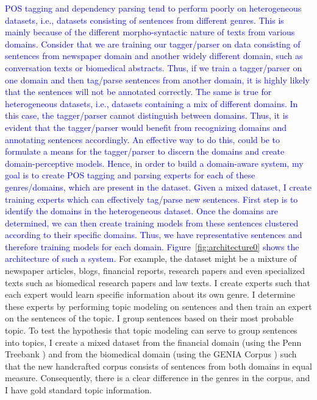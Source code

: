 \textcolor{blue}{POS tagging and dependency parsing tend to perform poorly on heterogeneous datasets, i.e., datasets consisting of sentences from different genres. This is mainly because of the different morpho-syntactic nature of texts from various domains. Consider that we are training our tagger/parser on data consisting of sentences from newspaper domain and another widely different domain, such as conversation texts or biomedical abstracts.  Thus, if we train a tagger/parser on one domain and then tag/parse sentences from another domain, it is highly likely that the sentences will not be annotated correctly. The same is true for heterogeneous datasets, i.e., datasets containing a mix of different domains. In this case, the tagger/parser cannot distinguish between domains.
Thus, it is evident that the tagger/parser would benefit from recognizing domains and annotating sentences accordingly. An effective way to do this, could be to formulate a means for the tagger/parser to discern the domains and create domain-perceptive models. 
Hence, in order to build a domain-aware system, my goal is to create POS tagging and parsing experts for each of these genres/domains, which are present in the dataset. Given a mixed dataset, I create training experts which can effectively tag/parse new sentences. First step is to identify the domains in the heterogeneous dataset. 
Once the domains are determined, we can then create training models from these sentences clustered according to their specific domains. Thus, we have representative sentences and therefore training models for each domain. Figure~\ref{fig:architecture0} shows the architecture of such a system.}
For example, the dataset might be a mixture of newspaper articles, blogs, financial reports, research papers and even specialized texts such as biomedical research papers and law texts. I create experts such that each expert would learn specific information about its own genre. I determine these experts by performing topic modeling on sentences and then train an expert on the sentences of the topic. I group sentences based on their most probable topic. To test the hypothesis that topic modeling can serve to group sentences into topics, I create a mixed dataset from the financial domain (using the Penn Treebank \cite{marcus:kim:ea:94}) and from the biomedical domain (using the GENIA Corpus \cite{tateisi:tsujii:04}) such that the new handcrafted corpus consists of sentences from both domains in equal measure. Consequently, there is a clear difference in the genres in the corpus, and I have gold standard topic information.

